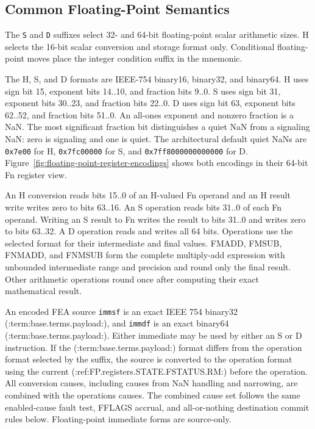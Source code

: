 \subsection{Common Floating-Point Semantics}
The \texttt{S} and \texttt{D} suffixes select 32- and 64-bit floating-point scalar arithmetic sizes. H selects the
16-bit scalar conversion and storage format only. Conditional floating-point moves place the integer condition
suffix in the mnemonic.


The H, S, and D formats are IEEE-754 binary16, binary32, and binary64. H uses sign bit 15, exponent bits 14..10,
and fraction bits 9..0. S uses sign bit 31, exponent bits 30..23, and fraction bits
22..0. D uses sign bit 63, exponent bits 62..52, and fraction bits 51..0. An all-ones exponent and nonzero fraction
is a NaN. The most significant fraction bit distinguishes a quiet NaN from a signaling NaN: zero is signaling and
one is quiet. The architectural default quiet NaNs are \texttt{0x7e00} for H, \texttt{0x7fc00000} for S, and
\texttt{0x7ff8000000000000} for D. Figure~\ref{fig:floating-point-register-encodings} shows both encodings in their
64-bit Fn register view.

An H conversion reads bits 15..0 of an H-valued Fn operand and an H result write writes zero to bits 63..16. An S
operation reads bits 31..0 of each Fn operand. Writing an S result to Fn writes the result to bits 31..0 and
writes zero to bits 63..32. A D operation reads and writes all 64 bits. Operations use the selected format for their
intermediate and final values. FMADD, FMSUB, FNMADD, and FNMSUB form the complete multiply-add expression with
unbounded intermediate range and precision and round only the final result. Other arithmetic operations round once
after computing their exact mathematical result.

An encoded FEA source \texttt{immsf} is an exact IEEE 754 binary32 (:term:base.terms.payload:), and \texttt{immdf} is an exact
binary64 (:term:base.terms.payload:). Either immediate may be used by either an S or D instruction. If the (:term:base.terms.payload:) format differs from
the operation format selected by the suffix, the source is converted to the operation format using the current
(:ref:FP.registers.STATE.FSTATUS.RM:) before the operation. All conversion causes, including causes from NaN handling and narrowing,
are combined with the operation\textquotesingle{}s causes. The combined cause set follows the same enabled-cause fault test, FFLAGS
accrual, and all-or-nothing destination commit rules below. Floating-point immediate forms are source-only.
